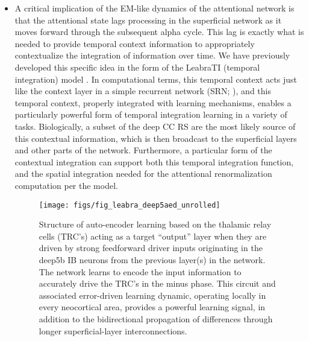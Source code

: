 \documentclass[11pt,twoside]{article}
\newif\myifpdf
\begin{document}
\begin{itemize}
\item A critical implication of the EM-like dynamics of the attentional network is that the attentional state lags processing in the superficial network as it moves forward through the subsequent alpha cycle.  This lag is exactly what is needed to provide temporal context information to appropriately contextualize the integration of information over time.  We have previously developed this specific idea in the form of the LeabraTI (temporal integration) model \cite{OReillyWyatteRohrlich14,KachergisWyatteOReillyEtAl14,SunOReillyBhattacharyyaEtAl15}.  In computational terms, this temporal context acts just like the context layer in a simple recurrent network (SRN; ), and this temporal context, properly integrated with learning mechanisms, enables a particularly powerful form of temporal integration learning in a variety of tasks.  Biologically, a subset of the deep CC RS are the most likely source of this contextual information, which is then broadcast to the superficial layers and other parts of the network.  Furthermore, a particular form of the contextual integration can support both this temporal integration function, and the spatial integration needed for the attentional renormalization computation per the  model.

\begin{figure}
  \centering\texttt{[image: figs/fig\_leabra\_deep5aed\_unrolled]}
  \caption{\small Structure of auto-encoder learning based on the thalamic relay cells (TRC's) acting as a target ``output'' layer when they are driven by strong feedforward driver inputs originating in the deep5b IB neurons from the previous layer(s) in the network.  The network learns to encode the input information to accurately drive the TRC's in the minus phase.  This circuit and associated error-driven learning dynamic, operating locally in every neocortical area, provides a powerful learning signal, in addition to the bidirectional propagation of differences through longer superficial-layer interconnections.}
  \label{fig.deep5aed}
\end{figure}


\end{itemize}
\end{document}
